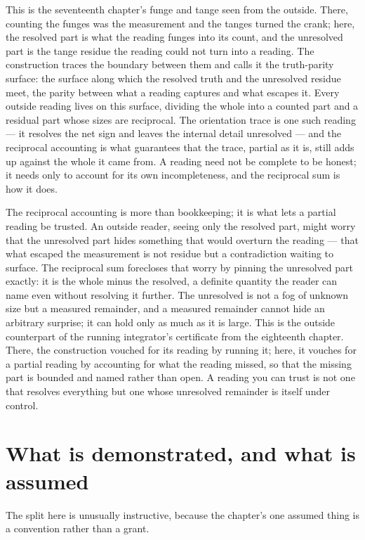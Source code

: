 This is the seventeenth chapter's funge and tange seen from the outside. There, counting the funges was
the measurement and the tanges turned the crank; here, the resolved part is what the reading funges into
its count, and the unresolved part is the tange residue the reading could not turn into a reading. The
construction traces the boundary between them and calls it the truth-parity surface: the surface along
which the resolved truth and the unresolved residue meet, the parity between what a reading captures and
what escapes it. Every outside reading lives on this surface, dividing the whole into a counted part and a
residual part whose sizes are reciprocal. The orientation trace is one such reading --- it resolves the
net sign and leaves the internal detail unresolved --- and the reciprocal accounting is what guarantees
that the trace, partial as it is, still adds up against the whole it came from. A reading need not be
complete to be honest; it needs only to account for its own incompleteness, and the reciprocal sum is how
it does.

The reciprocal accounting is more than bookkeeping; it is what lets a partial reading be trusted. An
outside reader, seeing only the resolved part, might worry that the unresolved part hides something that
would overturn the reading --- that what escaped the measurement is not residue but a contradiction
waiting to surface. The reciprocal sum forecloses that worry by pinning the unresolved part exactly: it is
the whole minus the resolved, a definite quantity the reader can name even without resolving it further.
The unresolved is not a fog of unknown size but a measured remainder, and a measured remainder cannot hide
an arbitrary surprise; it can hold only as much as it is large. This is the outside counterpart of the
running integrator's certificate from the eighteenth chapter. There, the construction vouched for its
reading by running it; here, it vouches for a partial reading by accounting for what the reading missed,
so that the missing part is bounded and named rather than open. A reading you can trust is not one that
resolves everything but one whose unresolved remainder is itself under control.

\section{What is demonstrated, and what is assumed}
\label{se:demonstrated-assumed-ch25}

The split here is unusually instructive, because the chapter's one assumed thing is a convention rather
than a grant.


